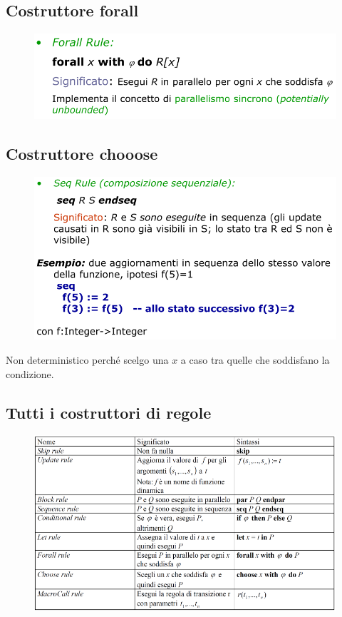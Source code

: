 \subsection{Costruttore forall}

\begin{figure}[H]
    \includegraphics[width=0.8\linewidth]{chapters/1-asm/images/forall.png}
\end{figure}


\subsection{Costruttore chooose}
\begin{figure}[H]
    \includegraphics[width=0.8\linewidth]{chapters/1-asm/images/seq.png}
\end{figure}

\noindent Non deterministico perché scelgo una $x$ a caso tra quelle 
che soddisfano la condizione.


\subsection{Tutti i costruttori di regole}

\begin{figure}[H]
    \centering
    \includegraphics[width=1\linewidth]{chapters/1-asm/images/costruttori.png}
\end{figure}


